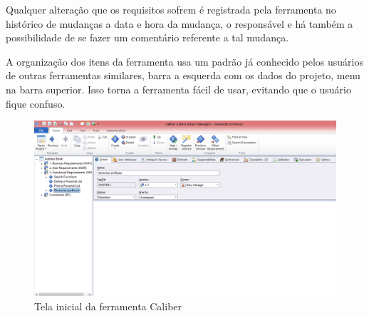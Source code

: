 Qualquer alteração que os requisitos sofrem é registrada pela ferramenta no histórico de mudanças a data e hora da mudança, o responsável e há
também a possibilidade de se fazer um comentário referente a tal mudança.

A organização dos itens da ferramenta usa um padrão já conhecido pelos usuários de outras ferramentas similares, barra a esquerda com os dados do projeto,
menu na barra superior. Isso torna a ferramenta fácil de usar, evitando que o usuário fique confuso.

\begin{figure}[!htb]
\centering
\includegraphics[scale=0.4]{figuras/caliber.png}
\caption{Tela inicial da ferramenta Caliber}
\end{figure}
